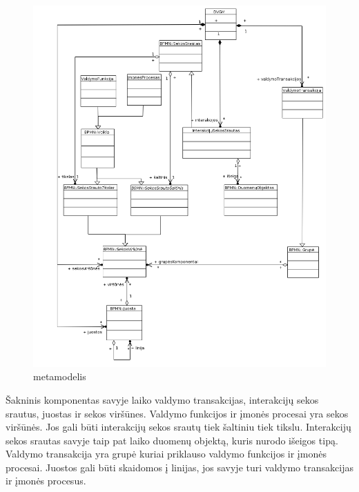 \begin{figure}[H]
	\centering
	\includegraphics[width=12cm]{img/dvcm_metamodel}
	\caption{\DVCM metamodelis}
	\label{img:dvcm_metamodel}
\end{figure}

Šakninis komponentas \DVCM savyje laiko valdymo transakcijas, interakcijų sekos srautus, juostas ir sekos viršūnes. Valdymo funkcijos ir įmonės procesai yra sekos viršūnės. Jos gali būti interakcijų sekos srautų tiek šaltiniu tiek tikslu. Interakcijų sekos srautas savyje taip pat laiko duomenų objektą, kuris nurodo išeigos tipą. Valdymo transakcija yra grupė kuriai priklauso valdymo funkcijos ir įmonės procesai. Juostos gali būti skaidomos į linijas, jos savyje turi valdymo transakcijas ir įmonės procesus.
